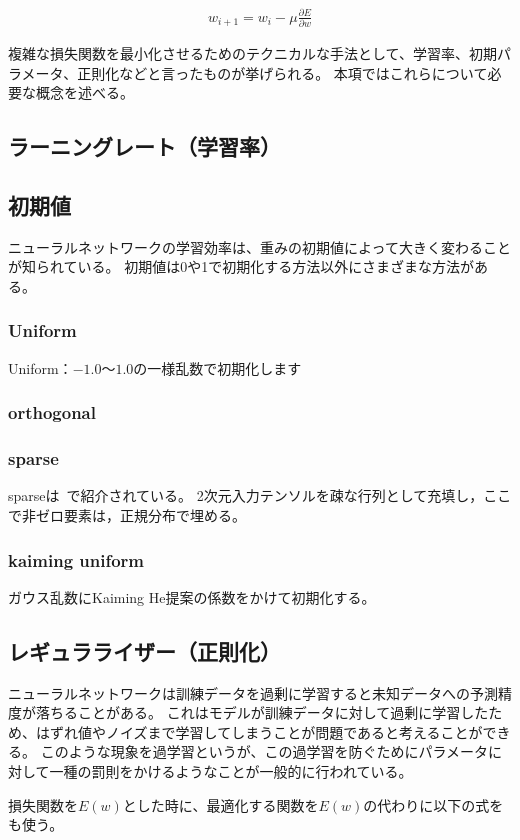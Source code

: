 \begin{eqnarray}
w_{i + 1} = w_i - \mu \frac{\partial E}{\partial w}
\label{eq:learning_rate}
\end{eqnarray}

複雑な損失関数を最小化させるためのテクニカルな手法として、学習率、初期パラメータ、正則化などと言ったものが挙げられる。
本項ではこれらについて必要な概念を述べる。
\subsection{ラーニングレート（学習率）}


\subsection{初期値}
ニューラルネットワークの学習効率は、重みの初期値によって大きく変わることが知られている。
初期値は0や1で初期化する方法以外にさまざまな方法がある。

\subsubsection{Uniform}
Uniform：$-1.0～1.0$の一様乱数で初期化します
\subsubsection{orthogonal}
\subsubsection{sparse}
sparseは~\cite{sim}で紹介されている。
2次元入力テンソルを疎な行列として充填し，ここで非ゼロ要素は，正規分布で埋める。
\subsubsection{kaiming uniform}
ガウス乱数にKaiming He提案の係数をかけて初期化する。

\subsection{レギュラライザー（正則化）}
ニューラルネットワークは訓練データを過剰に学習すると未知データへの予測精度が落ちることがある。
これはモデルが訓練データに対して過剰に学習したため、はずれ値やノイズまで学習してしまうことが問題であると考えることができる。
このような現象を過学習というが、この過学習を防ぐためにパラメータに対して一種の罰則をかけるようなことが一般的に行われている。

損失関数を$ E(w) $とした時に、最適化する関数を$E(w)$の代わりに以下の式をも使う。

